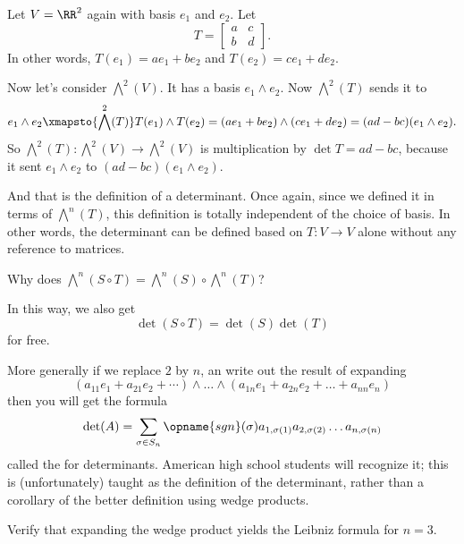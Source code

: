 \begin{example}
	Let $V = \RR^2$ again with basis $e_1$ and $e_2$.
	Let
	\[ T = \begin{bmatrix}
			a & c \\ b & d
		\end{bmatrix}.
	\]
	In other words, $T(e_1) = ae_1 + be_2$
	and $T(e_2) = ce_1 + de_2$.

	Now let's consider $\bigwedge^2(V)$.
	It has a basis $e_1 \wedge e_2$.
	Now $\bigwedge^2(T)$ sends it to
	\[ e_1 \wedge e_2 \xmapsto{\bigwedge^2(T)}
		T(e_1) \wedge T(e_2) =
		(ae_1 + be_2) \wedge (ce_1 + de_2)
		= (ad-bc)(e_1 \wedge e_2).
	\]
	So $\bigwedge^2(T) \colon \bigwedge^2(V) \to \bigwedge^2(V)$
	is multiplication by $\det T = ad-bc$,
	because it sent $e_1 \wedge e_2$ to
	$(ad-bc)(e_1 \wedge e_2)$.
\end{example}
And that is the definition of a determinant.
Once again, since we defined it in terms of $\bigwedge^n(T)$,
this definition is totally independent of the choice of basis.
In other words, the determinant can be defined based on $T \colon V \to V$ alone
without any reference to matrices.

\begin{ques}
	Why does $\bigwedge^n(S \circ T) = \bigwedge^n(S) \circ \bigwedge^n(T)$?
\end{ques}
In this way, we also get \[ \det(S \circ T) = \det(S) \det(T) \] for free.

More generally if we replace $2$ by $n$,
an write out the result of expanding
\[ \left( a_{11}e_1 + a_{21}e_2 + \cdots \right) \wedge \dots \wedge
	\left( a_{1n}e_1 + a_{2n}e_2 + \dots + a_{nn} e_n \right) \]
then you will get the formula
\[ \det(A) = \sum_{\sigma \in S_n} \opname{sgn}(\sigma)
	a_{1, \sigma(1)} a_{2, \sigma(2)} \dots a_{n, \sigma(n)} \]
called the  for determinants.
American high school students will recognize it;
this is (unfortunately) taught as the definition of the determinant,
rather than a corollary of the better definition using wedge products.

\begin{exercise}
	Verify that expanding the wedge product
	yields the Leibniz formula for $n=3$.
\end{exercise}


